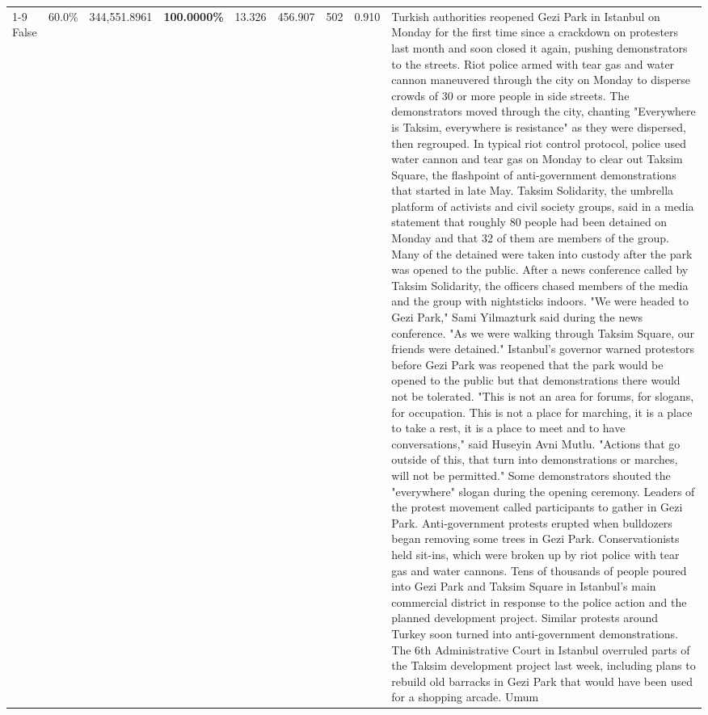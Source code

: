 \begin{table}[H]
\begin{tabular}{lllrlllll}
\cline{1-9}
False & 60.0\% & 344,551.8961 & \bfseries \color{red} 100.0000\% & 13.326 & 456.907 & 502 & 0.910 & Turkish authorities reopened Gezi Park in Istanbul on Monday for the first time since a crackdown on protesters last month and soon closed it again, pushing demonstrators to the streets. Riot police armed with tear gas and water cannon maneuvered through the city on Monday to disperse crowds of 30 or more people in side streets. The demonstrators moved through the city, chanting "Everywhere is Taksim, everywhere is resistance" as they were dispersed, then regrouped. In typical riot control protocol, police used water cannon and tear gas on Monday to clear out Taksim Square, the flashpoint of anti-government demonstrations that started in late May. Taksim Solidarity, the umbrella platform of activists and civil society groups, said in a media statement that roughly 80 people had been detained on Monday and that 32 of them are members of the group. Many of the detained were taken into custody after the park was opened to the public. After a news conference called by Taksim Solidarity, the officers chased members of the media and the group with nightsticks indoors. "We were headed to Gezi Park," Sami Yilmazturk said during the news conference. "As we were walking through Taksim Square, our friends were detained." Istanbul's governor warned protestors before Gezi Park was reopened that the park would be opened to the public but that demonstrations there would not be tolerated. "This is not an area for forums, for slogans, for occupation. This is not a place for marching, it is a place to take a rest, it is a place to meet and to have conversations," said Huseyin Avni Mutlu. "Actions that go outside of this, that turn into demonstrations or marches, will not be permitted." Some demonstrators shouted the "everywhere" slogan during the opening ceremony. Leaders of the protest movement called participants to gather in Gezi Park. Anti-government protests erupted when bulldozers began removing some trees in Gezi Park. Conservationists held sit-ins, which were broken up by riot police with tear gas and water cannons. Tens of thousands of people poured into Gezi Park and Taksim Square in Istanbul's main commercial district in response to the police action and the planned development project. Similar protests around Turkey soon turned into anti-government demonstrations. The 6th Administrative Court in Istanbul overruled parts of the Taksim development project last week, including plans to rebuild old barracks in Gezi Park that would have been used for a shopping arcade. Umum \\

\end{tabular}
\end{table}
